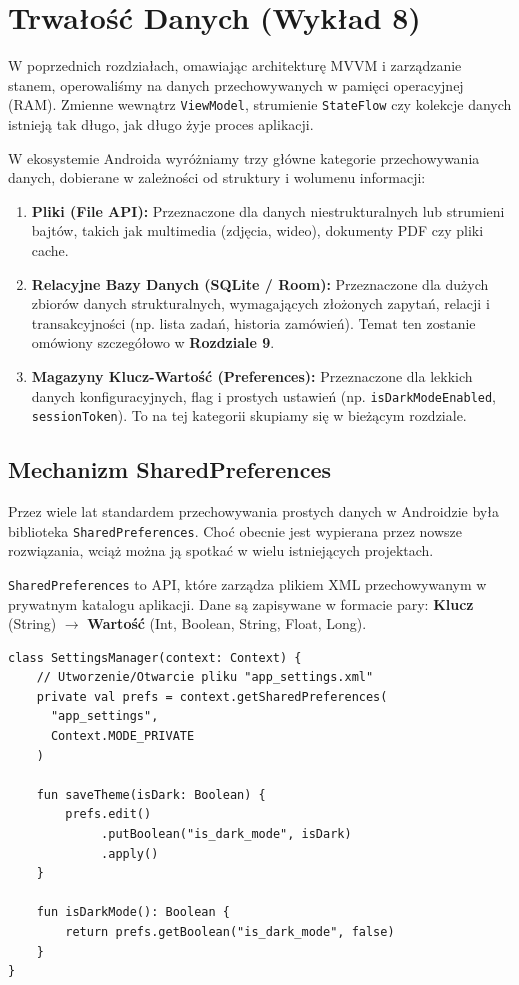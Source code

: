 \chapter{Trwałość Danych (Wykład 8)}

W poprzednich rozdziałach, omawiając architekturę MVVM i zarządzanie stanem, operowaliśmy na danych przechowywanych w pamięci operacyjnej (RAM). Zmienne wewnątrz \texttt{ViewModel}, strumienie \texttt{StateFlow} czy kolekcje danych istnieją tak długo, jak długo żyje proces aplikacji.

W ekosystemie Androida wyróżniamy trzy główne kategorie przechowywania danych, dobierane w zależności od struktury i wolumenu informacji:

\begin{enumerate}
    \item \textbf{Pliki (File API):} Przeznaczone dla danych niestrukturalnych lub strumieni bajtów, takich jak multimedia (zdjęcia, wideo), dokumenty PDF czy pliki cache.
    \item \textbf{Relacyjne Bazy Danych (SQLite / Room):} Przeznaczone dla dużych zbiorów danych strukturalnych, wymagających złożonych zapytań, relacji i transakcyjności (np. lista zadań, historia zamówień). Temat ten zostanie omówiony szczegółowo w \textbf{Rozdziale 9}.
    \item \textbf{Magazyny Klucz-Wartość (Preferences):} Przeznaczone dla lekkich danych konfiguracyjnych, flag i prostych ustawień (np. \texttt{isDarkModeEnabled}, \texttt{sessionToken}). To na tej kategorii skupiamy się w bieżącym rozdziale.
\end{enumerate}

\section{Mechanizm SharedPreferences}

Przez wiele lat standardem przechowywania prostych danych w Androidzie była biblioteka \texttt{SharedPreferences}. Choć obecnie jest wypierana przez nowsze rozwiązania, wciąż można ją spotkać w wielu istniejących projektach.

\texttt{SharedPreferences} to API, które zarządza plikiem XML przechowywanym w prywatnym katalogu aplikacji. Dane są zapisywane w formacie pary: \textbf{Klucz} (String) $\rightarrow$ \textbf{Wartość} (Int, Boolean, String, Float, Long).

\begin{verbatim}
class SettingsManager(context: Context) {
    // Utworzenie/Otwarcie pliku "app_settings.xml"
    private val prefs = context.getSharedPreferences(
      "app_settings", 
      Context.MODE_PRIVATE
    )

    fun saveTheme(isDark: Boolean) {
        prefs.edit()
             .putBoolean("is_dark_mode", isDark)
             .apply() 
    }

    fun isDarkMode(): Boolean {
        return prefs.getBoolean("is_dark_mode", false)
    }
}
\end{verbatim}

